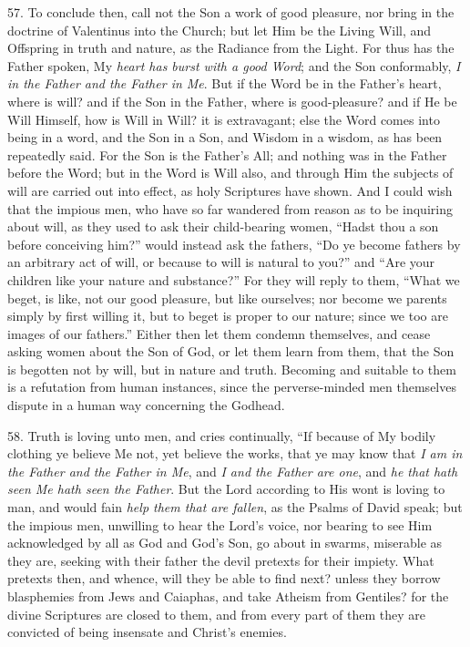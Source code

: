 57. To conclude then, call not
the Son a work of good pleasure, nor bring in the doctrine of
Valentinus into the Church; but let Him be the Living Will, and
Offspring in truth and nature, as the Radiance from the Light. For
thus has the Father spoken, My \emph{heart has burst with a good Word};
and the Son conformably, \emph{I in the Father and the Father in Me}.
But if the Word be in the Father's heart, where is will? and if the
Son in the Father, where is good-pleasure? and if He be Will Himself,
how is Will in Will? it is extravagant; else the Word comes into being
in a word, and the Son in a Son, and Wisdom in a wisdom, as has been
repeatedly said. For the Son is the Father's All; and nothing was in
the Father before the Word; but in the Word is Will also, and through
Him the subjects of will are carried out into effect, as holy
Scriptures have shown. And I could wish that the impious men, who have
so far wandered from reason as to be inquiring about will, as they
used to ask their child-bearing women, ``Hadst thou a son before
conceiving him?'' would instead ask the fathers, ``Do ye become fathers
by an arbitrary act of will, or because to will is natural to you?''
and ``Are your children like your nature and substance?'' For they will
reply to them, ``What we beget, is like, not our good pleasure, but
like ourselves; nor become we parents simply by first willing it, but
to beget is proper to our nature; since we too are images of our
fathers.'' Either then let them condemn themselves, and cease asking
women about the Son of God, or let them learn from them, that the Son
is begotten not by will, but in nature and truth. Becoming and
suitable to them is a refutation from human instances, since the
perverse-minded men themselves dispute in a human way concerning the
Godhead.

58. Truth is loving unto men,
and cries continually, ``If because of My bodily clothing ye believe Me
not, yet believe the works, that ye may know that \emph{I am in the
Father and the Father in Me}, and \emph{I and the Father are one},
and \emph{he that hath seen Me hath seen the Father}. But the Lord
according to His wont is loving to man, and would fain \emph{help them
that are fallen}, as the Psalms of David speak; but the impious
men, unwilling to hear the Lord's voice, nor bearing to see Him
acknowledged by all as God and God's Son, go about in swarms,
miserable as they are, seeking with their father the devil pretexts
for their impiety. What pretexts then, and whence, will they be able
to find next? unless they borrow blasphemies from Jews and Caiaphas,
and take Atheism from Gentiles? for the divine Scriptures are closed
to them, and from every part of them they are convicted of being
insensate and Christ's enemies.

